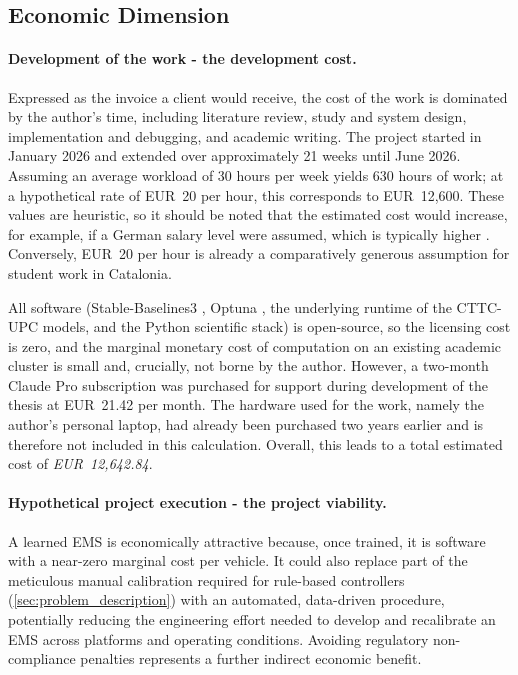 \subsection{Economic Dimension}

\paragraph{Development of the work - the development cost.} Expressed as the invoice a client would receive, the cost of the work is dominated by the author's time, including literature review, study and system design, implementation and debugging, and academic writing. The project started in January 2026 and extended over approximately 21 weeks until June 2026. Assuming an average workload of 30 hours per week yields 630 hours of work; at a hypothetical rate of EUR~20 per hour, this corresponds to EUR~12{,}600. These values are heuristic, so it should be noted that the estimated cost would increase, for example, if a German salary level were assumed, which is typically higher \cite{statistisches_bundesamt_earnings_nodate}. Conversely, EUR~20 per hour is already a comparatively generous assumption for student work in Catalonia.

All software (Stable-Baselines3 \cite{raffin_stable-baselines3_2021}, Optuna \cite{akiba_optuna_2019}, the underlying runtime of the CTTC-UPC models, and the Python scientific stack) is open-source, so the licensing cost is zero, and the marginal monetary cost of computation on an existing academic cluster is small and, crucially, not borne by the author. However, a two-month Claude Pro \cite{anthropic_claude_nodate} subscription was purchased for support during development of the thesis at EUR~21.42 per month. The hardware used for the work, namely the author's personal laptop, had already been purchased two years earlier and is therefore not included in this calculation. Overall, this leads to a total estimated cost of \emph{EUR~12{,}642.84}.

\paragraph{Hypothetical project execution - the project viability.} A learned \ac{EMS} is economically attractive because, once trained, it is software with a near-zero marginal cost per vehicle. It could also replace part of the meticulous manual calibration required for rule-based controllers (\autoref{sec:problem_description}) with an automated, data-driven procedure, potentially reducing the engineering effort needed to develop and recalibrate an \ac{EMS} across platforms and operating conditions. Avoiding regulatory non-compliance penalties represents a further indirect economic benefit.

